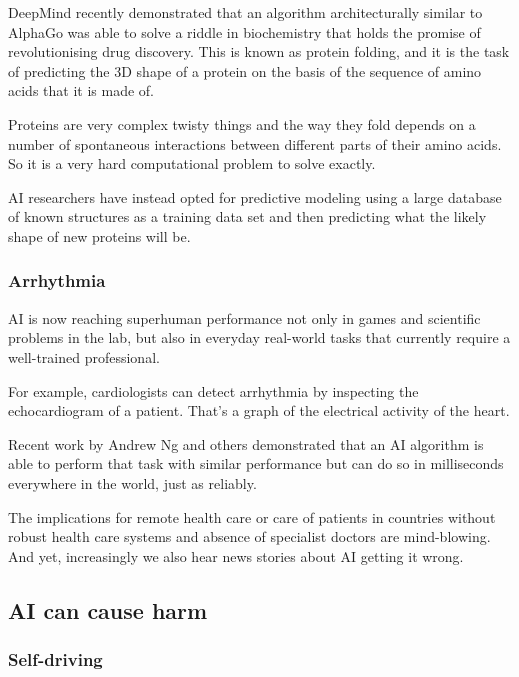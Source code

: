 \documentclass[
]{book}
\theoremstyle{definition}
\theoremstyle{definition}
\theoremstyle{definition}
\theoremstyle{definition}
\theoremstyle{remark}
\begin{document}
DeepMind recently demonstrated that an algorithm architecturally similar to AlphaGo was able to solve a riddle in biochemistry that holds the promise of
revolutionising drug discovery. This is known as protein folding, and
it is the task of predicting the 3D shape of a protein on the basis of the sequence of amino acids that it is made of.

Proteins are very complex twisty things and the way they fold depends on a number of spontaneous interactions between different parts of their amino acids. So it is a very hard computational
problem to solve exactly.

AI researchers have instead opted for predictive modeling using a large database of known structures as a training data set and then predicting what the likely shape of new proteins will be.

\hypertarget{arrhythmia}{%
\subsubsection{Arrhythmia}\label{arrhythmia}}

AI is now reaching superhuman performance not only in games and scientific problems in the lab, but also in everyday real-world tasks that currently require
a well-trained professional.

For example, cardiologists can detect arrhythmia by inspecting the echocardiogram of a patient. That's a graph of the electrical
activity of the heart.

Recent work by Andrew Ng and others demonstrated that an AI algorithm is able to perform that task with similar performance but can do so in milliseconds everywhere in the world, just as reliably.

The implications for remote health care or care of patients in countries without robust health care systems and absence of specialist doctors are mind-blowing. And yet, increasingly we also hear news stories about AI getting it wrong.

\hypertarget{ai-can-cause-harm}{%
\subsection{AI can cause harm}\label{ai-can-cause-harm}}

\hypertarget{self-driving}{%
\subsubsection{Self-driving}\label{self-driving}}
\end{document}
